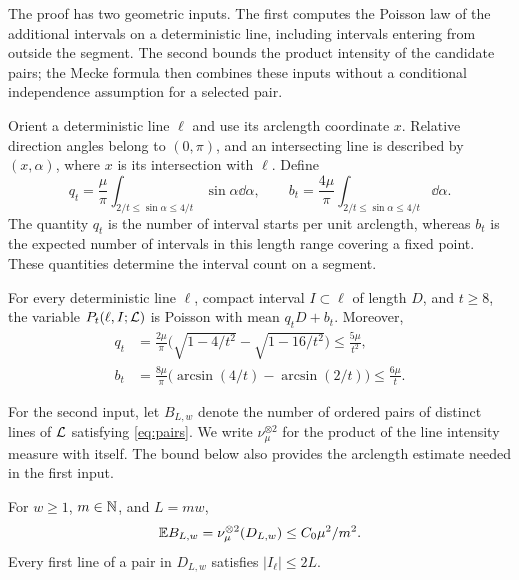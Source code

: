 \documentclass[11pt,letterpaper]{article}
\begin{document}
The proof has two geometric inputs. The first computes the Poisson law of the additional intervals on a deterministic line, including intervals entering from outside the segment. The second bounds the product intensity of the candidate pairs; the Mecke formula then combines these inputs without a conditional independence assumption for a selected pair.

Orient a deterministic line $\ell$ and use its arclength coordinate $x$. Relative direction angles belong to $(0,\pi)$, and an intersecting line is described by $(x,\alpha)$, where $x$ is its intersection with $\ell$. Define
\[
 q_t=\frac{\mu}{\pi}\int_{2/t\le\sin\alpha\le4/t}\sin\alpha\dd\alpha,
 \qquad
 b_t=\frac{4\mu}{\pi}\int_{2/t\le\sin\alpha\le4/t}\dd\alpha.
\]
The quantity $q_t$ is the number of interval starts per unit arclength, whereas $b_t$ is the expected number of intervals in this length range covering a fixed point. These quantities determine the interval count on a segment.

\begin{lemma}\label{lem:intervals}
For every deterministic line $\ell$, compact interval $I\subset\ell$ of length $D$, and $t\ge8$, the variable $P_t(\ell,I;\mathcal L)$ is Poisson with mean $q_tD+b_t$. Moreover,
\begin{equation}\label{eq:rates}
\begin{aligned}
 q_t&=\frac{2\mu}{\pi}
       \big(\sqrt{1-4/t^2}-\sqrt{1-16/t^2}\big)
       \le\frac{5\mu}{t^2},\\
 b_t&=\frac{8\mu}{\pi}
       \big(\arcsin(4/t)-\arcsin(2/t)\big)
       \le\frac{6\mu}{t}.
\end{aligned}
\end{equation}
\end{lemma}

For the second input, let $B_{L,w}$ denote the number of ordered pairs of distinct lines of $\mathcal L$ satisfying \eqref{eq:pairs}. We write $\nu_\mu^{\otimes2}$ for the product of the line intensity measure with itself. The bound below also provides the arclength estimate needed in the first input.

\begin{lemma}\label{lem:pairs}
For $w\ge1$, $m\in\mathbb N$, and $L=mw$,
\[
 \mathbb E B_{L,w}=\nu_\mu^{\otimes2}(D_{L,w})
       \le C_0\mu^2/m^2.
\]
Every first line of a pair in $D_{L,w}$ satisfies $|I_\ell|\le2L$.
\end{lemma}
\end{document}
